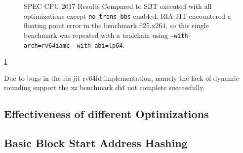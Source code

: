 \documentclass[course=eragp]{aspdoc}
\begin{document}
\begin{figure}
\begin{centering}
        \caption{
            SPEC CPU 2017 Results Compared to SBT executed with all optimizations except \texttt{no\_trans\_bbs} enabled.
            RIA-JIT encountered a floating point error in the benchmark 625.x264, so this single benchmark was repeated with a toolchain using \texttt{--with-arch=rv64iamc --with-abi=lp64}.
        }\label{benchmark_results1}
    \end{centering}
\end{figure}

\ref{benchmark_results1}

Due to bugs in the ria-jit rv64fd implementation, namely the lack of dynamic rounding support %
the xz benchmark did not complete successfully.

\subsection{Effectiveness of different Optimizations}

\subsection{Basic Block Start Address Hashing}
\end{document}

